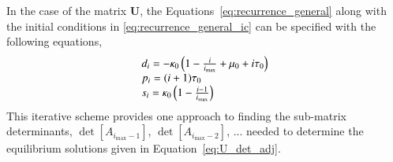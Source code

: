\documentclass[review]{elsarticle}
\newcommand{\imax}{\ensuremath{i_{\max}}\xspace}
\let\bs\boldsymbol
\begin{document}
In the case of the matrix $\bs{U}$, the Equations~\ref{eq:recurrence_general} along with the initial conditions in \ref{eq:recurrence_general_ic} can be specified with the following equations,
\[
\begin{array}{l}
d_{i}=-\kappa_0\left(1-\frac{i}{\imax}+\mu_0+i\text{\ensuremath{\tau_0}}\right)\\
p_{i}=(i+1)\tau_0\\
  s_{i}=\kappa_0\left(1-\frac{i-1}{\imax}\right)
\end{array}
\]
This iterative scheme provides one approach to finding the sub-matrix determinants, $\det[A_{\imax-1}]$, $\det[A_{\imax-2}]$, $... $ needed to determine the equilibrium solutions given in Equation~\ref{eq:U_det_adj}. 



 

\end{document}
